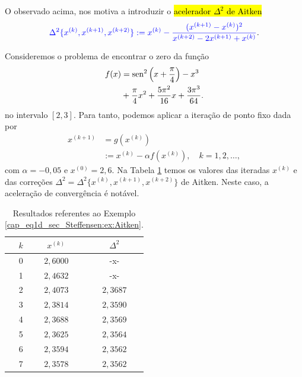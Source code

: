 O observado acima, nos motiva a introduzir o \hl{acelerador $\Delta^2$ de Aitken}
\begin{equation}\label{cap_eq1d_sec_Steffensen:eq:ac_aitken}
  {\color{blue}\Delta^2\{x^{(k)},x^{(k+1)},x^{(k+2)}\} := x^{(k)} - \frac{(x^{(k+1)}-x^{(k)})^2}{x^{(k+2)}-2x^{(k+1)}+x^{(k)}}}.
\end{equation}


\begin{ex}\label{cap_eq1d_sec_Steffensen:ex:Aitken}
  Consideremos o problema de encontrar o zero da função
  \begin{equation}
    \begin{aligned}
      f(x) &= \operatorname{sen}^2\left(x+\frac{\pi}{4}\right) - x^3 \\
      &+ \frac{\pi}{4}x^2 + \frac{5\pi^2}{16}x + \frac{3\pi^3}{64}.
  \end{aligned}
  \end{equation}
  no intervalo $[2,3]$. Para tanto, podemos aplicar a iteração de ponto fixo dada por
  \begin{equation}
    \begin{aligned}
      x^{(k+1)} &= g(x^{(k)}) \\
      &:= x^{(k)} - \alpha f(x^{(k)}),\quad k=1,2,\ldots,
  \end{aligned}
  \end{equation}
com $\alpha=-0,05$ e $x^{(0)}=2,6$. Na Tabela \ref{cap_eq1d_sec_Steffensen:tab:ex_Aitken} temos os valores das iteradas $x^{(k)}$ e das correções $\Delta^2 = \Delta^2\{x^{(k)},x^{(k+1)},x^{(k+2)}\}$ de Aitken. Neste caso, a aceleração de convergência é notável.

\begin{table}[H]
  \centering
  \caption{Resultados referentes ao Exemplo \ref{cap_eq1d_sec_Steffensen:ex:Aitken}.}
  \label{cap_eq1d_sec_Steffensen:tab:ex_Aitken}
  \begin{tabular}{r|cc}
    $k$ & $x^{(k)}$ & $\Delta^2$ \\\hline
    0 & $2,6000$ & -x- \\
    1 & $2,4632$ & -x- \\
    2 & $2,4073$ & $2,3687$ \\
    3 & $2,3814$ & $2,3590$ \\
    4 & $2,3688$ & $2,3569$ \\
    5 & $2,3625$ & $2,3564$ \\
    6 & $2,3594$ & $2,3562$ \\
    7 & $2,3578$ & $2,3562$ \\\hline
  \end{tabular}
\end{table}


\end{ex}

